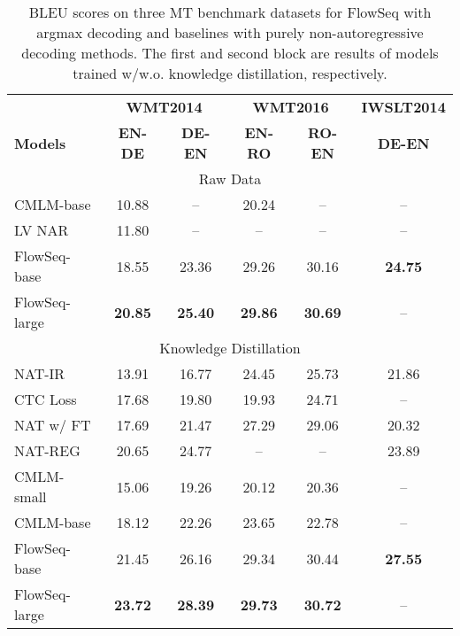 \documentclass[11pt,a4paper]{article}
\begin{document}
\begin{table}[t]
\centering
\resizebox{1.0\columnwidth}{!}
{\begin{tabular}{lccccc}
\toprule
 & \multicolumn{2}{c}{\textbf{WMT2014}} & \multicolumn{2}{c}{\textbf{WMT2016}} & \textbf{IWSLT2014}\\
\textbf{ Models} & \textbf{EN-DE} & \textbf{DE-EN} & \textbf{EN-RO} & \textbf{RO-EN} & \textbf{DE-EN} \\
\midrule\midrule
\multicolumn{6}{c}{Raw Data} \\
\midrule
CMLM-base & 10.88 & -- & 20.24 & -- & -- \\
LV NAR & 11.80 & -- & -- & -- & -- \\
\midrule
FlowSeq-base & 18.55 & 23.36 & 29.26 & 30.16 & \textbf{24.75} \\
FlowSeq-large & \textbf{20.85} & \textbf{25.40} & \textbf{29.86} & \textbf{30.69} & -- \\
\midrule\midrule
\multicolumn{6}{c}{Knowledge Distillation} \\ 
\midrule
NAT-IR & 13.91 & 16.77 & 24.45 & 25.73 & 21.86 \\
CTC Loss & 17.68 & 19.80 & 19.93 & 24.71 & -- \\
NAT w/ FT & 17.69 & 21.47 & 27.29 & 29.06 & 20.32 \\
NAT-REG & 20.65 & 24.77 & -- & -- & 23.89 \\
CMLM-small & 15.06 & 19.26 & 20.12 & 20.36 & -- \\
CMLM-base & 18.12 & 22.26 & 23.65 & 22.78 & -- \\
\midrule
FlowSeq-base & 21.45 & 26.16 & 29.34 & 30.44 & \textbf{27.55} \\
FlowSeq-large & \textbf{23.72} & \textbf{28.39} & \textbf{29.73} & \textbf{30.72} & -- \\
\bottomrule
\end{tabular}
}
\caption{BLEU scores on three MT benchmark datasets for FlowSeq with argmax decoding and baselines with purely non-autoregressive decoding methods.  
The first and second block are results of models trained w/w.o. knowledge distillation, respectively.}
\label{tab:pure}
\vspace{-4mm}
\end{table}
\end{document}
